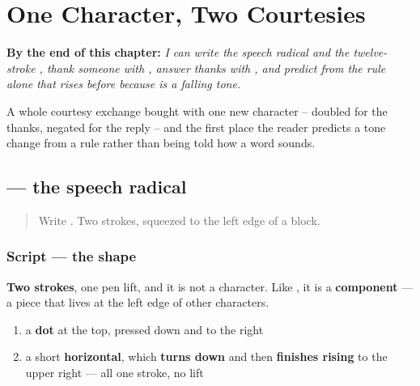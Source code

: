 
\chapter{One Character, Two Courtesies}
\label{ch:zh-xiexie}

\begin{chapteropening}
\textbf{By the end of this chapter:} \emph{I can write the speech radical  and the twelve-stroke , thank someone with , answer thanks with , and predict from the rule alone that  rises before  because  is a falling tone.}

A whole courtesy exchange bought with one new character -- doubled for the thanks, negated for the reply -- and the first place the reader predicts a tone change from a rule rather than being told how a word sounds.
\end{chapteropening}

\section[\texorpdfstring{\zh{讠} (yán)}{讠 (yán)}]{ — the speech radical}

\label{lesson:ZH-W10-yan}



\begin{quote}
Write . Two strokes, squeezed to the left edge of a block.
\end{quote}

\subsection*{Script — the shape}

\begin{quote}
\end{quote}

\textbf{Two strokes}, one pen lift, and it is not a character. Like , it is a \textbf{component} — a piece that lives at the left edge of other characters.

\begin{enumerate}
\raggedright
  \item a \textbf{dot} at the top, pressed down and to the right
  \item a short \textbf{horizontal}, which \textbf{turns down} and then \textbf{finishes rising} to the upper right — all one stroke, no lift
\end{enumerate}

